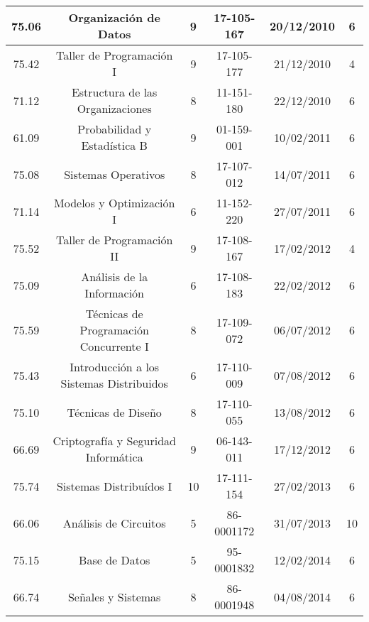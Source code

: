 {\begin{center}
\begin{tabular}{|c|c|c|c|c|c|}
            \hline
            75.06 & Organización de Datos                       &  9   &  17-105-167  &  20/12/2010  & 6  \\
            \hline
            75.42 & Taller de Programación I                    &  9   &  17-105-177  &  21/12/2010  & 4  \\
            \hline
            71.12 & Estructura de las Organizaciones            &  8   &  11-151-180  &  22/12/2010  & 6  \\
            \hline
            61.09 & Probabilidad y Estadística B                &  9   &  01-159-001  &  10/02/2011  & 6  \\
            \hline
            75.08 & Sistemas Operativos                         &  8   &  17-107-012  &  14/07/2011  & 6  \\
            \hline
            71.14 & Modelos y Optimización I                    &  6   &  11-152-220  &  27/07/2011  & 6  \\
            \hline
            75.52 & Taller de Programación II                   &  9   &  17-108-167  &  17/02/2012  & 4  \\
            \hline
            75.09 & Análisis de la Información                  &  6   &  17-108-183  &  22/02/2012  & 6  \\
            \hline
            75.59 & Técnicas de Programación Concurrente I      &  8   &  17-109-072  &  06/07/2012  & 6  \\
            \hline
            75.43 & Introducción a los Sistemas Distribuidos    &  6   &  17-110-009  &  07/08/2012  & 6  \\
            \hline
            75.10 & Técnicas de Diseño                          &  8   &  17-110-055  &  13/08/2012  & 6  \\
            \hline
            66.69 & Criptografía y Seguridad Informática        &  9   &  06-143-011  &  17/12/2012  & 6  \\
            \hline
            75.74 & Sistemas Distribuídos I                     &  10  &  17-111-154  &  27/02/2013  & 6  \\
            \hline
            66.06 & Análisis de Circuitos                       &  5   &  86-0001172  &  31/07/2013  & 10 \\
            \hline
            75.15 & Base de Datos                               &  5   &  95-0001832  &  12/02/2014  & 6  \\
            \hline
            66.74 & Señales y Sistemas                          &  8   &  86-0001948  &  04/08/2014  & 6  \\

\end{tabular}
\end{center}}
